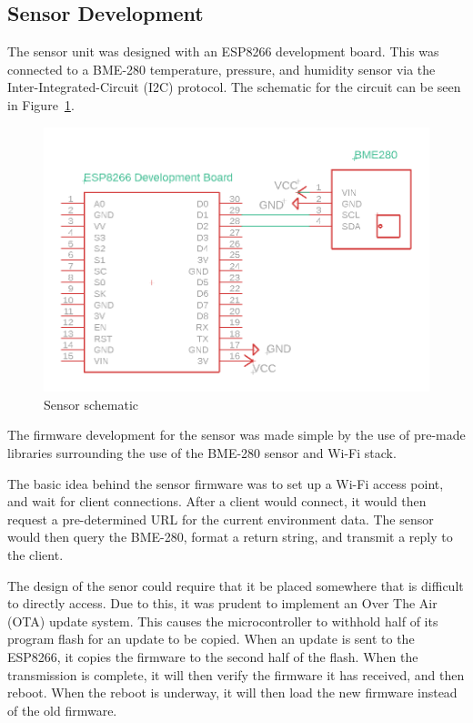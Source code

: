 \documentclass[onecolumn, 12pt]{IEEEConf}
\begin{document}
    \subsection{Sensor Development}
        The sensor unit was designed with an ESP8266 development board.
        This was connected to a BME-280 temperature, pressure, and humidity sensor via the
        Inter-Integrated-Circuit (I2C) protocol.
        The schematic for the circuit can be seen in Figure~\ref{fig:ServerSchematic}.
        
        \begin{figure}
            \centering
            \includegraphics[max width=\textwidth,keepaspectratio,scale=.6]{images/ServerSchematic.png}
            \caption{\label{fig:ServerSchematic}Sensor schematic}
        \end{figure}

        The firmware development for the sensor was made simple by the use of pre-made libraries
        surrounding the use of the BME-280 sensor and Wi-Fi stack.

        The basic idea behind the sensor firmware was to set up a Wi-Fi access point, and wait for client connections.
        After a client would connect, it would then request a pre-determined URL for the current environment data.
        The sensor would then query the BME-280, format a return string, and transmit a reply to the client.

        The design of the senor could require that it be placed somewhere that is difficult to directly access.
        Due to this, it was prudent to implement an Over The Air (OTA) update system.
        This causes the microcontroller to withhold half of its program flash for an update to be copied.
        When an update is sent to the ESP8266, it copies the firmware to the second half of the flash.
        When the transmission is complete, it will then verify the firmware it has received, and then reboot.
        When the reboot is underway, it will then load the new firmware instead of the old firmware.
\end{document}
